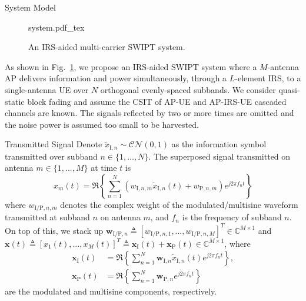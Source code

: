 \documentclass[journal]{IEEEtran}
\begin{document}
	\begin{section}{System Model}\label{se:system_model}
		\begin{figure}[!t]
			\centering
			\def\svgwidth{0.9\columnwidth}
			{system.pdf_tex}
			\caption{An IRS-aided multi-carrier SWIPT system.}
			\label{fi:system}
		\end{figure}

		As shown in Fig.~\ref{fi:system}, we propose an IRS-aided SWIPT system where a $M$-antenna AP delivers information and power simultaneously, through a $L$-element IRS, to a single-antenna UE over $N$ orthogonal evenly-spaced subbands. We consider quasi-static block fading and assume the CSIT of AP-UE and AP-IRS-UE cascaded channels are known. The signals reflected by two or more times are omitted and the noise power is assumed too small to be harvested.


		\begin{subsection}{Transmitted Signal}
			Denote $\tilde{x}_{\mathrm{I},n}\sim\mathcal{CN}(0,1)$ as the information symbol transmitted over subband $n \in \{1, \dots, N\}$. The superposed signal transmitted on antenna $m \in \{1, \dots, M\}$ at time $t$ is
			\begin{equation}\label{eq:x_m}
				x_m(t)=\Re\left\{\sum_{n=1}^N\left({w_{\mathrm{I},n,m}\tilde{x}_{\mathrm{I},n}(t)}+w_{\mathrm{P},n,m}\right){e^{j2{\pi}{f_n}{t}}}\right\}
			\end{equation}
			where $w_{\mathrm{I/P},n,m}$ denotes the complex weight of the modulated/multisine waveform transmitted at subband $n$ on antenna $m$, and $f_n$ is the frequency of subband $n$. On top of this, we stack up $\boldsymbol{w}_{\mathrm{I/P},n} \triangleq [w_{\mathrm{I/P},n,1},\dots,w_{\mathrm{I/P},n,M}]^T \in \mathbb{C}^{M \times 1}$ and $\boldsymbol{x}(t) \triangleq [x_1(t),\dots,x_M(t)]^T \triangleq \boldsymbol{x}_{\mathrm{I}}(t)+\boldsymbol{x}_{\mathrm{P}}(t) \in \mathbb{C}^{M \times 1}$, where
			\begin{align}
				\boldsymbol{x}_{\mathrm{I}}(t) &= \Re{\left\{\sum_{n=1}^N\boldsymbol{w}_{\mathrm{I},n}\tilde{x}_{\mathrm{I},n}(t){e^{j2{\pi}{f_n}{t}}}\right\}},\label{eq:x_I}\\
				\boldsymbol{x}_{\mathrm{P}}(t) &= \Re{\left\{\sum_{n=1}^N\boldsymbol{w}_{\mathrm{P},n}{e^{j2{\pi}{f_n}{t}}}\right\}}\label{eq:x_P}
			\end{align}
			are the modulated and multisine components, respectively.
		\end{subsection}



\end{section}
\end{document}
